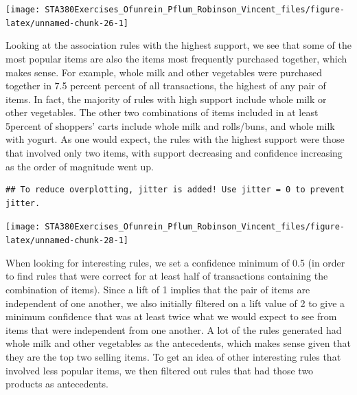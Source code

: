 \documentclass[
]{article}
\begin{document}
\begin{center}\texttt{[image: STA380Exercises\_Ofunrein\_Pflum\_Robinson\_Vincent\_files/figure-latex/unnamed-chunk-26-1]} \end{center}

Looking at the association rules with the highest support, we see that
some of the most popular items are also the items most frequently
purchased together, which makes sense. For example, whole milk and other
vegetables were purchased together in 7.5 percent percent of all
transactions, the highest of any pair of items. In fact, the majority of
rules with high support include whole milk or other vegetables. The
other two combinations of items included in at least 5percent of
shoppers' carts include whole milk and rolls/buns, and whole milk with
yogurt. As one would expect, the rules with the highest support were
those that involved only two items, with support decreasing and
confidence increasing as the order of magnitude went up.

\begin{verbatim}
## To reduce overplotting, jitter is added! Use jitter = 0 to prevent jitter.
\end{verbatim}

\begin{center}\texttt{[image: STA380Exercises\_Ofunrein\_Pflum\_Robinson\_Vincent\_files/figure-latex/unnamed-chunk-28-1]} \end{center}

When looking for interesting rules, we set a confidence minimum of 0.5
(in order to find rules that were correct for at least half of
transactions containing the combination of items). Since a lift of 1
implies that the pair of items are independent of one another, we also
initially filtered on a lift value of 2 to give a minimum confidence
that was at least twice what we would expect to see from items that were
independent from one another. A lot of the rules generated had whole
milk and other vegetables as the antecedents, which makes sense given
that they are the top two selling items. To get an idea of other
interesting rules that involved less popular items, we then filtered out
rules that had those two products as antecedents.
\end{document}
